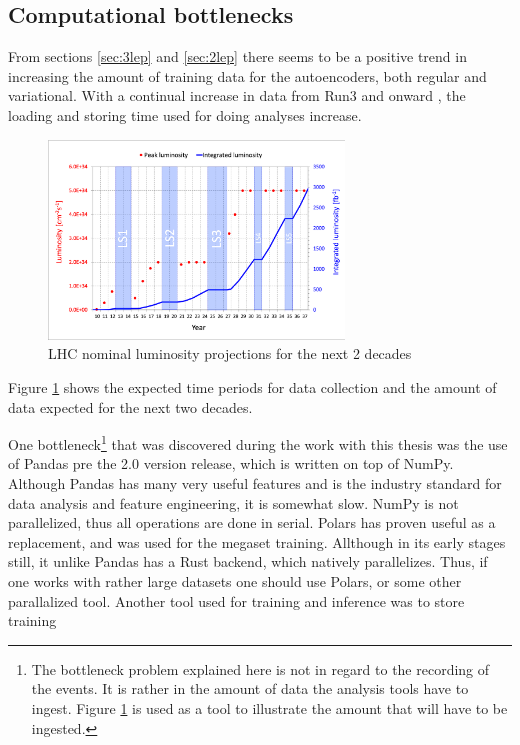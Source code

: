 \subsection*{Computational bottlenecks}
From sections \ref{sec:3lep} and \ref{sec:2lep} there seems to be a positive trend in increasing the amount 
of training data for the autoencoders, both regular and variational. With a continual increase in data from 
Run3 and onward \cite{LHC_int_lum}, the loading and storing time used for doing analyses increase. 

\begin{figure}[h!]
    \caption[LHC nominal luminosity projections]{LHC nominal luminosity projections for the next 2 decades}
    \label{fig:lhc_nom}
    \centering
    \includegraphics[width=0.7\textwidth]{Figures/atlas/LHC-nominal-lumi-projection.png}
\end{figure}
Figure \ref{fig:lhc_nom} shows the expected time periods for data collection and the amount of data expected for 
the next two decades. \par
One bottleneck\footnote{The bottleneck problem explained here is not in regard to the recording of the events. 
It is rather in the amount of data the analysis tools have to ingest. Figure \ref{fig:lhc_nom} is used as a tool
to illustrate the amount that will have to be ingested. } that was discovered during the work with this thesis was 
the use of Pandas pre the 2.0 version release, which is 
written on top of NumPy. Although Pandas has many very useful features and is the industry standard for 
data analysis and feature engineering, it is somewhat slow. NumPy is not parallelized, thus all operations are 
done in serial. Polars has proven useful as a replacement, and was used for the megaset training. Allthough in its 
early stages still, it unlike Pandas has a Rust backend, which natively parallelizes. Thus, if one works with rather 
large datasets one should use
Polars, or some other parallalized tool. Another tool used for training and inference was to store training 
